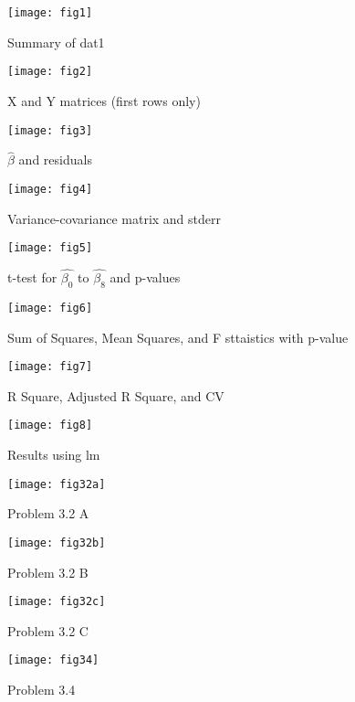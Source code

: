 \documentclass[letterpaper,11pt]{article}
\begin{document}
	\begin{figure}[h!]
	\centering
	\texttt{[image: fig1]}
	\caption{Summary of dat1}
	\end{figure}
	


	\begin{figure}[h!]
	\centering
	\texttt{[image: fig2]}
	\caption{X and Y matrices (first rows only)}
	\end{figure}
		
		
	\begin{figure}[h!]
	\centering
	\texttt{[image: fig3]}
	\caption{ $\hat{\beta}$ and residuals}
	\end{figure}

	\begin{figure}[h!]
	\centering
	\texttt{[image: fig4]}
	\caption{Variance-covariance matrix and stderr}
	\end{figure}
				
	\begin{figure}[h!]
	\centering
	\texttt{[image: fig5]}
	\caption{t-test for $\hat{\beta_{0}}$ to $\hat{\beta_{8}}$ and p-values}
	\end{figure}
					
	\begin{figure}[h!]
	\centering
	\texttt{[image: fig6]}
	\caption{Sum of Squares, Mean Squares, and F sttaistics with p-value}
	\end{figure}
						
	\begin{figure}[h!]
	\centering
	\texttt{[image: fig7]}
	\caption{R Square, Adjusted R Square, and CV}
	\end{figure}						

	\begin{figure}[h!]
	\centering
	\texttt{[image: fig8]}
	\caption{Results using lm}
	\end{figure}
				
	\begin{figure}[h!]
	\centering
	\texttt{[image: fig32a]}
	\caption{Problem 3.2 A}
	\end{figure}
			
	\begin{figure}[h!]
	\centering
	\texttt{[image: fig32b]}
	\caption{Problem 3.2 B}
	\end{figure}			
			
	\begin{figure}[h!]
	\centering
	\texttt{[image: fig32c]}
	\caption{Problem 3.2 C}
	\end{figure}
				
	\begin{figure}[h!]
	\centering
	\texttt{[image: fig34]}
	\caption{Problem 3.4}
	\end{figure}	
					
\end{document}
